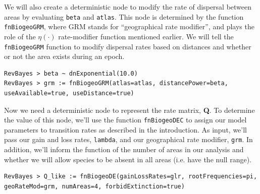 \documentclass[11pt]{article}
\begin{document}
We will also create a deterministic node to modify the rate of dispersal between areas by evaluating {\tt beta} and {\tt atlas}.
This node is determined by the function {\tt fnBiogeoGRM}, where GRM stands for ``geographical rate modifier'', and plays the role of the $\eta(\cdot)$ rate-modifier function mentioned earlier.
We will tell the {\tt fnBiogeoGRM} function to modify dispersal rates based on distances and whether or not the area exists during an epoch.

\begin{snugshade}
\begin{lstlisting}
RevBayes > beta ~ dnExponential(10.0)
RevBayes > grm := fnBiogeoGRM(atlas=atlas, distancePower=beta, useAvailable=true, useDistance=true)
\end{lstlisting}
\end{snugshade}

Now we need a deterministic node to represent the rate matrix, {\bf Q}.
To determine the value of this node, we'll use the function {\tt fnBiogeoDEC} to assign our model parameters to transition rates as described in the introduction.
As input, we'll pass our gain and loss rates, {\tt lambda}, and our geographical rate modifier, {\tt grm}.
In addition, we'll inform the function of the number of areas in our analysis and whether we will allow species to be absent in all areas (i.e. have the null range).

\begin{snugshade}
\begin{lstlisting}
RevBayes > Q_like := fnBiogeoDE(gainLossRates=glr, rootFrequencies=pi, geoRateMod=grm, numAreas=4, forbidExtinction=true)
\end{lstlisting}
\end{snugshade}
\end{document}
